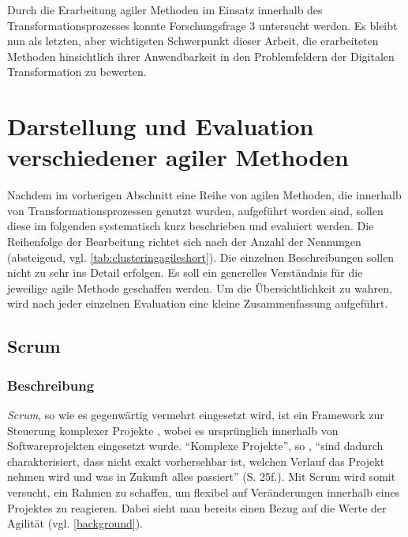 Durch die Erarbeitung agiler Methoden im Einsatz innerhalb des Transformationsprozesses konnte Forschungsfrage 3 untersucht  werden. Es bleibt nun als letzten, aber wichtigsten Schwerpunkt dieser Arbeit, die erarbeiteten Methoden hinsichtlich ihrer Anwendbarkeit in den Problemfeldern der Digitalen Transformation zu bewerten.

\section{Darstellung und Evaluation verschiedener agiler Methoden}
\label{agilepractices:evaluation}


Nachdem im vorherigen Abschnitt eine Reihe von agilen Methoden, die innerhalb von Transformationsprozessen genutzt wurden, aufgeführt worden sind, sollen diese im folgenden systematisch kurz beschrieben und evaluiert werden. Die Reihenfolge der Bearbeitung richtet sich nach der Anzahl der Nennungen (absteigend, vgl. \ref{tab:clusteringagileshort}). Die einzelnen Beschreibungen sollen nicht zu sehr ins Detail erfolgen. Es soll ein generelles Verständnis für die jeweilige agile Methode geschaffen werden. Um die Übersichtlichkeit zu wahren, wird nach jeder einzelnen Evaluation eine kleine Zusammenfassung aufgeführt.

\subsection{Scrum}

\subsubsection{Beschreibung}

\textit{Scrum}, so wie es gegenwärtig vermehrt eingesetzt wird, ist ein Framework zur Steuerung komplexer Projekte \cite[S. 25]{wirdemann_scrum_2017}, wobei es ursprünglich innerhalb von Softwareprojekten eingesetzt wurde. ``Komplexe Projekte'', so , ``sind
dadurch charakterisiert, dass nicht exakt vorhersehbar ist, welchen Verlauf das Projekt nehmen wird und was in Zukunft alles passiert'' (S. 25f.). Mit Scrum wird somit versucht, ein Rahmen zu schaffen, um flexibel auf Veränderungen innerhalb eines Projektes zu reagieren. Dabei sieht man bereits einen Bezug auf die Werte der Agilität (vgl. \ref{background}).

